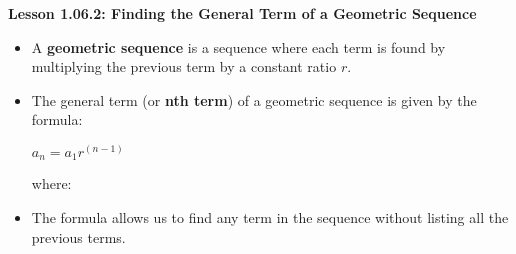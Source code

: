 \begin{center}
\textbf{Lesson 1.06.2: Finding the General Term of a Geometric Sequence}
\end{center}

\vspace*{-1.5ex}

\begin{itemize}
    \item A \textbf{geometric sequence} is a sequence where each term is found by multiplying the previous term by a constant ratio \( r \).
    \item The general term (or \textbf{nth term}) of a geometric sequence is given by the formula:

{\centering $  a_n = a_1 r^{(n-1)}  $\par}
          where:
          \begin{itemize}
          \end{itemize}
    \item The formula allows us to find any term in the sequence without listing all the previous terms.
\end{itemize}
